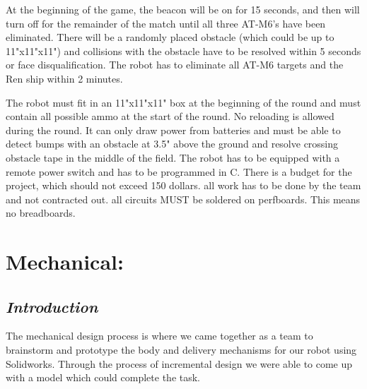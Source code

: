 \documentclass[]{article}
\begin{document}
At the beginning of the game, the beacon will be on for 15 seconds, and then will turn off for the remainder of the match until all three AT-M6's have been eliminated. There will be a randomly placed obstacle (which could be up to 11"x11"x11") and collisions with the obstacle have to be resolved within 5 seconds or face disqualification. The robot has to eliminate all AT-M6 targets and the Ren ship within 2 minutes.

The robot must fit in an 11"x11"x11" box at the beginning of the round and must contain all possible ammo at the start of the round. No reloading is allowed during the round. It can only draw power from batteries and must be able to detect bumps with an obstacle at 3.5" above the ground and resolve crossing obstacle tape in the middle of the field. The robot has to be equipped with a remote power switch and has to be programmed in C. 
There is a budget for the project, which should not exceed 150 dollars. all work has to be done by the team and not contracted out. all circuits MUST be soldered on perfboards. This means no breadboards.

\section*{Mechanical:}
\subsection*{\textit{Introduction}}
The mechanical design process is where we came together as a team to brainstorm and prototype the body and delivery mechanisms for our robot using Solidworks. Through the process of incremental design we were able to come up with a model which could complete the task.
\end{document}
